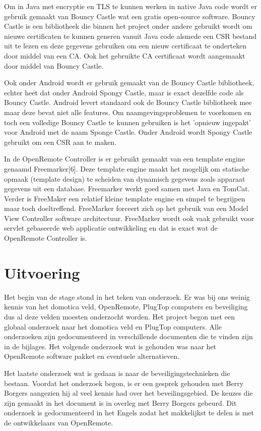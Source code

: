 \documentclass{article}
\begin{document}
Om in Java met encryptie en TLS te kunnen werken in native Java code wordt
er gebruik gemaakt van Bouncy Castle wat een gratis open-source software.
Bouncy Castle is een bibliotheek die binnen het project onder andere
gebruikt wordt om nieuwe certificaten te kunnen generen vanuit Java code
alsmede een CSR bestand uit te lezen en deze gegevens gebruiken om een
nieuw certificaat te onderteken door middel van een CA. Ook het gebruikte
CA certificaat wordt aangemaakt door middel van Bouncy Castle.

Ook onder Android wordt er gebruik gemaakt van de Bouncy Castle
bibliotheek, echter heet dat onder Android Spongy Castle, maar is exact
dezelfde code als Bouncy Castle. Android levert standaard ook de Bouncy
Castle bibliotheek mee maar deze bevat niet alle features. Om
naamgevingsproblemen te voorkomen en toch een volledige Bouncy Castle te
kunnen gebruiken is het 'opnieuw ingepakt' voor Android met de naam Sponge
Castle. Onder Android wordt Spongy Castle gebruikt om een CSR aan te maken.

In de OpenRemote Controller is er gebruikt gemaakt van een template engine
genaamd Freemarker[6]. Deze template engine maakt het mogelijk om statische
opmaak (template design) te scheiden van dynamisch gegevens zoals apparaat
gegevens uit een database. Freemarker werkt goed samen met Java en TomCat.
Verder is FreeMaker een relatief kleine template engine en simpel te
begrijpen maar toch doeltreffend. FreeMarker forceert zich op het gebruik
van een Model View Controller software architectuur. FreeMarker wordt ook
vaak gebruikt voor servlet gebaseerde web applicatie ontwikkeling en dat is
exact wat de OpenRemote Controller is.

\newpage
\section{Uitvoering}

Het begin van de stage stond in het teken van onderzoek. Er was bij ons
weinig kennis van het domotica veld, OpenRemote, PlugTop computers en
beveiliging dus al deze velden moesten onderzocht worden. Het project begon
met een globaal onderzoek naar het domotica veld en PlugTop computers. Alle
onderzoeken zijn gedocumenteerd in verschillende documenten die te vinden
zijn in de bijlages. Het volgende onderzoek wat is gehouden was naar het
OpenRemote software pakket en eventuele alternatieven.

Het laatste onderzoek wat is gedaan is naar de beveiligingstechnieken die
bestaan. Voordat het onderzoek begon, is er een gesprek gehouden met Berry
Borgers aangezien hij al veel kennis had over het beveilingsgebied. De
keuzes die zijn gemaakt in het document is in overleg met Berry Borgers
gebeurd. Dit onderzoek is gedocumenteerd in het Engels zodat het
makkelijkst te delen is met de ontwikkelaars van OpenRemote.
\end{document}
